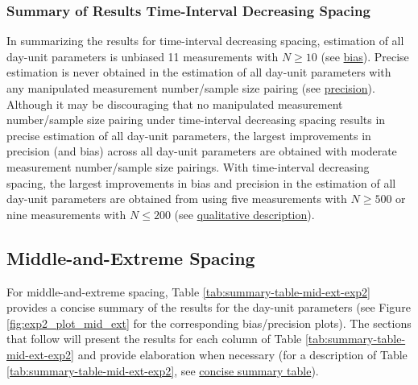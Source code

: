 \documentclass[
12pt, %
twoside,
english]{guelphthesis}
\begin{document}
\hypertarget{summary-of-results-time-interval-decreasing-spacing-1}{%
\subsubsection{Summary of Results Time-Interval Decreasing Spacing}\label{summary-of-results-time-interval-decreasing-spacing-1}}

In summarizing the results for time-interval decreasing spacing, estimation of all day-unit parameters is unbiased 11 measurements with \(N \ge 10\) (see \protect\hyperlink{bias-time-dec-exp2}{bias}). Precise estimation is never obtained in the estimation of all day-unit parameters with any manipulated measurement number/sample size pairing (see \protect\hyperlink{precision-time-inc-exp2}{precision}). Although it may be discouraging that no manipulated measurement number/sample size pairing under time-interval decreasing spacing results in precise estimation of all day-unit parameters, the largest improvements in precision (and bias) across all day-unit parameters are obtained with moderate measurement number/sample size pairings. With time-interval decreasing spacing, the largest improvements in bias and precision in the estimation of all day-unit parameters are obtained from using five measurements with \(N \ge 500\) or nine measurements with \(N \le 200\) (see \protect\hyperlink{qualitative-time-inc-exp2}{qualitative description}).

\hypertarget{middle-and-extreme-spacing-1}{%
\subsection{Middle-and-Extreme Spacing}\label{middle-and-extreme-spacing-1}}

For middle-and-extreme spacing, Table \ref{tab:summary-table-mid-ext-exp2} provides a concise summary of the results for the day-unit parameters (see Figure \ref{fig:exp2_plot_mid_ext} for the corresponding bias/precision plots). The sections that follow will present the results for each column of Table \ref{tab:summary-table-mid-ext-exp2} and provide elaboration when necessary (for a description of Table \ref{tab:summary-table-mid-ext-exp2}, see \protect\hyperlink{concise-example}{concise summary table}).
\end{document}
